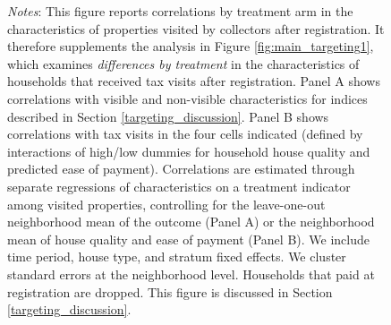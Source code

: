 \documentclass[12pt,english]{article}
\renewcommand{\footnotesize}{\fontsize{9pt}{11pt}\selectfont}\usepackage[unicode=true,
\begin{document}
\begin{figure}[H]
\parbox{6in}{\footnotesize \textit{Notes}: This figure reports correlations by treatment arm in the characteristics of properties visited by collectors after registration. It therefore supplements the analysis in Figure \ref{fig:main_targeting1}, which examines \textit{differences by treatment} in the characteristics of households that received tax visits after registration. Panel A shows correlations with visible and non-visible characteristics for indices described in Section \ref{targeting_discussion}.  Panel B shows correlations with tax visits in the four cells indicated (defined by interactions of high/low dummies for household house quality and predicted ease of payment). Correlations are estimated through separate regressions of characteristics on a treatment indicator among visited properties, controlling for the leave-one-out neighborhood mean of the outcome (Panel A) or the neighborhood mean of house quality and ease of payment (Panel B). We include time period, house type, and stratum fixed effects. We cluster standard errors at the neighborhood level. Households that paid at registration are dropped. This figure is discussed in Section \ref{targeting_discussion}.}
\end{figure}

\end{document}
